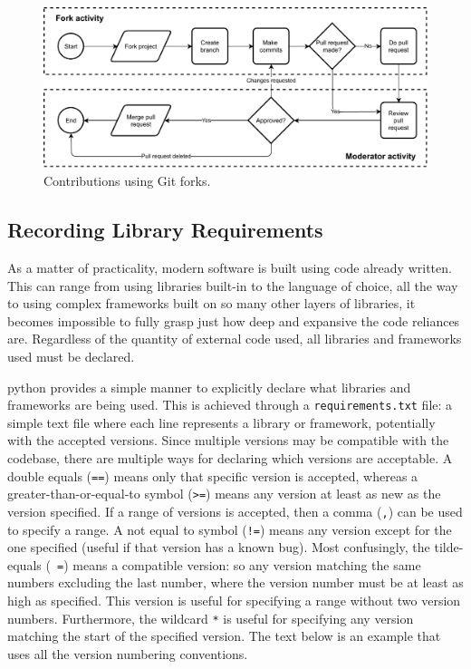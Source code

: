 \documentclass[11pt]{article}
\begin{document}
\begin{figure}[t!]
    \centering
    \includegraphics[width=1.0\textwidth]{figures/git_using_forks.pdf}
    \caption{Contributions using Git forks.}
    \label{fig:git-forks}
\end{figure}

\subsection{Recording Library Requirements}

As a matter of practicality, modern software is built using code already written. This can range from using libraries built-in to the language of choice, all the way to using complex \glspl{framework} built on so many other layers of libraries, it becomes impossible to fully grasp just how deep and expansive the code reliances are. Regardless of the quantity of external code used, all libraries and \glspl{framework} used must be declared.

\Gls{python} provides a simple manner to explicitly declare what libraries and \glspl{framework} are being used. This is achieved through a \texttt{requirements.txt} file: a simple text file where each line represents a \gls{library} or \gls{framework}, potentially with the accepted versions. Since multiple versions may be compatible with the codebase, there are multiple ways for declaring which versions are acceptable. A double equals (\texttt{==}) means only that specific version is accepted, whereas a greater-than-or-equal-to symbol (\texttt{>=}) means any version at least as new as the version specified. If a range of versions is accepted, then a comma (\texttt{,}) can be used to specify a range. A not equal to symbol (\texttt{!=}) means any version except for the one specified (useful if that version has a known bug). Most confusingly, the tilde-equals (\texttt{~=}) means a compatible version: so any version matching the same numbers excluding the last number, where the version number must be at least as high as specified. This version is useful for specifying a range without two version numbers. Furthermore, the wildcard \texttt{*} is useful for specifying any version matching the start of the specified version. The text below is an example that uses all the version numbering conventions.
\end{document}
